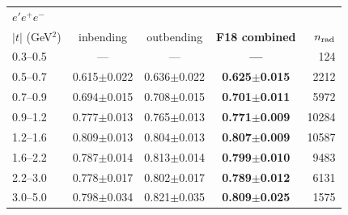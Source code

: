 \medskip

\begin{tabular}{lcccr}\toprule
\multicolumn{5}{l}{$e'e^+e^-$}\\
$|t|$ (GeV$^2$) & inbending & outbending & \textbf{F18 combined} & $n_{\rm rad}$ \\\midrule
0.3--0.5 & --- & --- & \textbf{---} & 124 \\
0.5--0.7 & 0.615$\pm$0.022 & 0.636$\pm$0.022 & \textbf{0.625$\pm$0.015} & 2212 \\
0.7--0.9 & 0.694$\pm$0.015 & 0.708$\pm$0.015 & \textbf{0.701$\pm$0.011} & 5972 \\
0.9--1.2 & 0.777$\pm$0.013 & 0.765$\pm$0.013 & \textbf{0.771$\pm$0.009} & 10284 \\
1.2--1.6 & 0.809$\pm$0.013 & 0.804$\pm$0.013 & \textbf{0.807$\pm$0.009} & 10587 \\
1.6--2.2 & 0.787$\pm$0.014 & 0.813$\pm$0.014 & \textbf{0.799$\pm$0.010} & 9483 \\
2.2--3.0 & 0.778$\pm$0.017 & 0.802$\pm$0.017 & \textbf{0.789$\pm$0.012} & 6131 \\
3.0--5.0 & 0.798$\pm$0.034 & 0.821$\pm$0.035 & \textbf{0.809$\pm$0.025} & 1575 \\
\bottomrule\end{tabular}

\medskip

